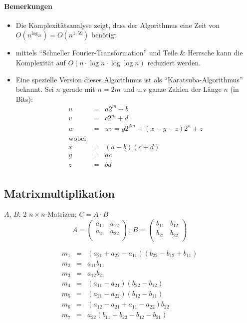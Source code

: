 \documentclass[a4paper,twoside,DIV15,BCOR12mm]{scrbook}
\begin{document}
\paragraph{Bemerkungen}
\begin{itemize}
	\item Die Komplexitätsanalyse zeigt, dass der Algorithmus eine Zeit von $O(n^{\log_23})=O(n^{1,59})$ benötigt
	\item mittels "`Schneller Fourier-Transformation"' und Teile \& Herrsche kann die Komplexität auf 
				$O(n \cdot \log n \cdot \log \log n)$ reduziert werden.
	\item Eine spezielle Version dieses Algorithmus ist als "`Karatsuba-Algorithmus"' bekannt.
				Sei $n$ gerade mit $n=2m$ und u,v ganze Zahlen der Länge $n$ (in Bits):
				\begin{eqnarray*}
					u   & = & a2^m+b \\
					v   & = & c2^m+d \\
					w   & = & uv = y2^{2m}+(x-y-z)2^n+z \\
					\text{wobei } & & \\
					x & = & (a+b)(c+d) \\
					y & = & ac \\
					z & = & bd \\
				\end{eqnarray*}
\end{itemize}

\subsection{Matrixmultiplikation}
$A$, $B$: 2 $n \times n$-Matrizen; $C = A \cdot B$
$$A=\left(\begin{array}{ll}
	a_{11} & a_{12} \\
	a_{21} & a_{22} \\
\end{array}\right);\ B=
\left(\begin{array}{ll}
	b_{11} & b_{12} \\
	b_{21} & b_{22} \\
\end{array}\right)$$

\begin{eqnarray*}
	m_1 & = & (a_{21} + a_{22} - a_{11})(b_{22}-b_{12}+b_{11}) \\
	m_2 & = & a_{11}b_{11} \\
	m_3 & = & a_{12}b_{21} \\
	m_4 & = & (a_{11}-a_{21})(b_{22}-b_{12}) \\
	m_5 & = & (a_{21}-a_{22})(b_{12}-b_{11}) \\
	m_6 & = & (a_{12}-a_{21}+a_{11}-a_{22})b_{22} \\
	m_7 & = & a_{22}(b_{11}+b_{22}-b_{12}-b_{21}) \\
\end{eqnarray*}
\end{document}
